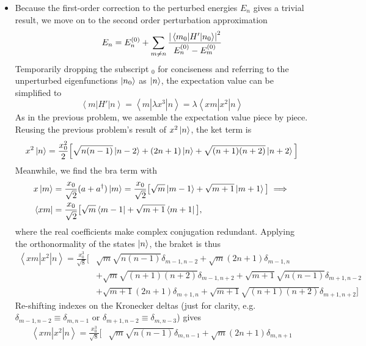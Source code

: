 \documentclass[11pt, a4paper]{article}
\newcommand{\pert}{perturbation\xspace}
\newcommand{\threebraket}[3]{\left \langle {#1} \left | {#2} \right | {#3} \right \rangle}  %
\begin{document}
\begin{itemize}
	\item Because the first-order correction to the perturbed energies $ E_{n} $ gives a trivial result, we move on to the second order \pert approximation
	\begin{equation*}
		E_{n} = E^{(0)}_{n} + \sum_{m \neq n} \frac{\abs{\mel{m_{0}}{H'}{n_{0}}}^{2}}{E^{(0)}_{n} - E^{(0)}_{m}}
	\end{equation*}
	Temporarily dropping the subscript $ _{0} $ for conciseness and referring to the unperturbed eigenfunctions $ \ket{n_{0}} $ as $ \ket{n} $, the expectation value can be simplified to
	\begin{equation*}
		\threebraket{m}{H'}{n} = \threebraket{m}{\lambda x^{3}}{n} = \lambda \threebraket{xm}{x^{2}}{n}
	\end{equation*}
	As in the previous problem, we assemble the expectation value piece by piece. Reusing the previous problem's result of $ x^{2}\ket{n} $, the ket term is
	\begin{equation*}
		x^{2}\ket{n} = \frac{x_{0}^{2}}{2}\Big[\sqrt{n(n-1)}\ket{n-2}+(2n+1)\ket{n}+\sqrt{(n+1)(n+2)}\ket{n+2}\Big]
	\end{equation*}
	Meanwhile, we find the bra term with 
	\begin{align*}
		&x \ket{m} = \frac{x_{0}}{\sqrt{2}}(a + a^{\dagger})\ket{m} = \frac{x_{0}}{\sqrt{2}}\big[\sqrt{m}\ket{m-1} + \sqrt{m+1}\ket{m+1}\big] \implies \\
		&\bra{xm} = \frac{x_{0}}{\sqrt{2}}\big[\sqrt{m}\bra{m-1} + \sqrt{m+1}\bra{m+1}\big],
	\end{align*}
	where the real coefficients make complex conjugation redundant. Applying the orthonormality of the states $ \ket{n} $, the braket is thus
	\begin{align*}
		\threebraket{xm}{x^{2}}{n} = \frac{x_{0}^{3}}{\sqrt{8}}\Big[&\sqrt{m}\sqrt{n(n-1)} \delta_{m-1,n-2} + \sqrt{m}(2n+1)\delta_{m-1,n}\\
		& + \sqrt{m}\sqrt{(n+1)(n+2)}\delta_{m-1,n+2} + \sqrt{m+1}\sqrt{n(n-1)}\delta_{m+1,n-2}\\
		& + \sqrt{m+1}(2n+1)\delta_{m+1,n} + \sqrt{m+1}\sqrt{(n+1)(n+2)}\delta_{m+1,n+2} \Big]
	\end{align*}
	Re-shifting indexes on the Kronecker deltas (just for clarity, e.g. $ \delta_{m-1,n-2} \equiv \delta_{m, n-1} $ or $ \delta_{m+1, n-2} \equiv \delta_{m, n-3} $) gives
	\begin{align*}
		\threebraket{xm}{x^{2}}{n} = \frac{x_{0}^{3}}{\sqrt{8}}\Big[&\sqrt{m}\sqrt{n(n-1)} \delta_{m,n-1} + \sqrt{m}(2n+1)\delta_{m,n+1}\\

\end{align*}
\end{itemize}
\end{document}
